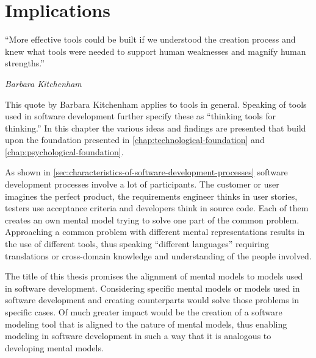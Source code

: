 \chapter{Implications}
\label{chap:possible-applications}
\epigraph{``More effective tools could be built if we understood the creation process and knew what tools were needed to support human weaknesses and magnify human strengths.''}{\textit{Barbara Kitchenham}}
\noindent
This quote by Barbara Kitchenham applies to tools in general.
Speaking of tools used in software development \textcite{kitchenham_research_1990} further specify these as ``thinking tools for thinking.''
In this chapter the various ideas and findings are presented that build upon the foundation presented in \cref{chap:technological-foundation} and \cref{chap:psychological-foundation}.

As shown in \cref{sec:characteristics-of-software-development-processes} software development processes involve a lot of participants.
The customer or user imagines the perfect product, the requirements engineer thinks in user stories, testers use acceptance criteria and developers think in source code.
Each of them creates an own mental model trying to solve one part of the common problem.
Approaching a common problem with different mental representations results in the use of different tools, thus speaking ``different languages'' requiring translations or cross-domain knowledge and understanding of the people involved.

The title of this thesis promises the alignment of mental models to models used in software development.
Considering specific mental models or models used in software development and creating counterparts would solve those problems in specific cases.
Of much greater impact would be the creation of a software modeling tool that is aligned to the nature of mental models, thus enabling modeling in software development in such a way that it is analogous to developing mental models.


